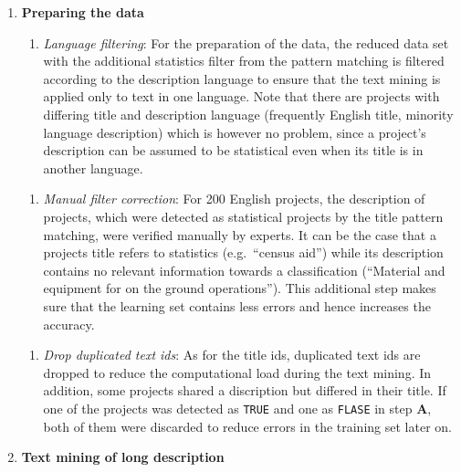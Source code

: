 \documentclass[
]{article}
\providecommand{\tightlist}{%
  \setlength{\itemsep}{0pt}\setlength{\parskip}{0pt}}
\begin{document}
\begin{enumerate}
\def\labelenumi{\arabic{enumi}.}
\item
  \textbf{Preparing the data}

  \begin{enumerate}
  \def\labelenumii{\roman{enumii}.}
  \tightlist
  \item
    \emph{Language filtering}: For the preparation of the data, the reduced data set with the additional statistics filter from the pattern matching is filtered according to the description language to ensure that the text mining is applied only to text in one language. Note that there are projects with differing title and description language (frequently English title, minority language description) which is however no problem, since a project's description can be assumed to be statistical even when its title is in another language.
  \end{enumerate}

  \begin{enumerate}
  \def\labelenumii{\roman{enumii}.}
  \setcounter{enumii}{1}
  \tightlist
  \item
    \emph{Manual filter correction}: For 200 English projects, the description of projects, which were detected as statistical projects by the title pattern matching, were verified manually by experts. It can be the case that a projects title refers to statistics (e.g.~``census aid'') while its description contains no relevant information towards a classification (``Material and equipment for on the ground operations''). This additional step makes sure that the learning set contains less errors and hence increases the accuracy.
  \end{enumerate}

  \begin{enumerate}
  \def\labelenumii{\roman{enumii}.}
  \setcounter{enumii}{2}
  \tightlist
  \item
    \emph{Drop duplicated text ids}: As for the title ids, duplicated text ids are dropped to reduce the computational load during the text mining. In addition, some projects shared a discription but differed in their title. If one of the projects was detected as \texttt{TRUE} and one as \texttt{FLASE} in step \textbf{A}, both of them were discarded to reduce errors in the training set later on.
  \end{enumerate}
\item
  \textbf{Text mining of long description}


\end{enumerate}
\end{document}
